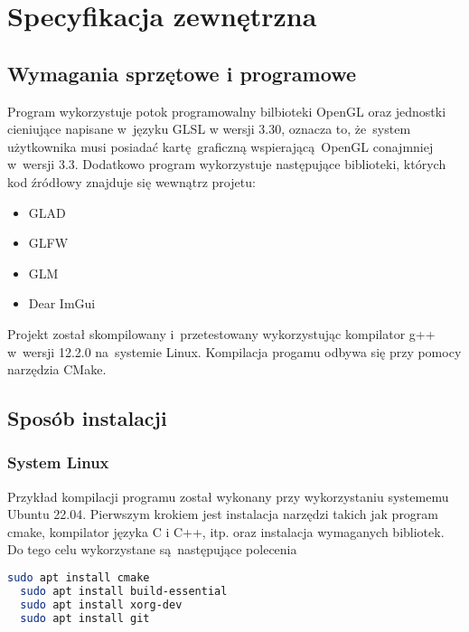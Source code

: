 \chapter{Specyfikacja zewnętrzna}
\label{ch:04}

\section{Wymagania sprzętowe i programowe}

Program wykorzystuje potok programowalny bilbioteki OpenGL oraz jednostki cieniujące napisane w~języku GLSL w wersji 3.30, oznacza to, że~system użytkownika musi posiadać kartę graficzną wspierającą OpenGL conajmniej w~wersji 3.3.
Dodatkowo program wykorzystuje następujące biblioteki, których kod źródłowy znajduje się wewnątrz projetu:
\begin{itemize}
\item GLAD
\item GLFW
\item GLM
\item Dear ImGui
\end{itemize}

Projekt został skompilowany i~przetestowany wykorzystując kompilator g++
w~wersji 12.2.0 na~systemie Linux. Kompilacja progamu odbywa się przy pomocy narzędzia CMake.

\section{Sposób instalacji}
\subsection{System Linux}
Przykład kompilacji programu został wykonany przy wykorzystaniu systememu Ubuntu 22.04. Pierwszym krokiem jest instalacja narzędzi takich jak program cmake, kompilator języka C i C++, itp. oraz instalacja wymaganych bibliotek.
Do tego celu wykorzystane są następujące polecenia
\lstset{basicstyle=\ttfamily, language=bash}
\begin{lstlisting}[language=bash]
  sudo apt install cmake
  sudo apt install build-essential
  sudo apt install xorg-dev
  sudo apt install git
\end{lstlisting}

